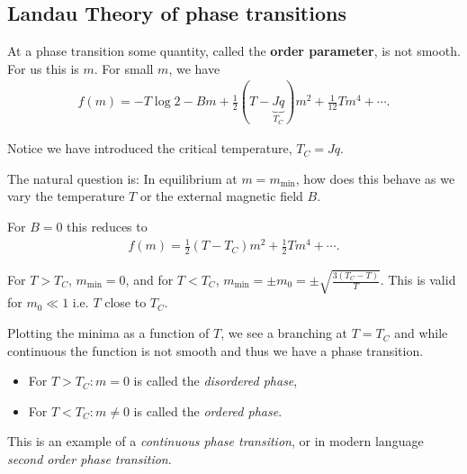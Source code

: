 \subsection{Landau Theory of phase transitions}

At a phase transition some quantity, called the \textbf{order parameter}, is not smooth. For us this is $m$. For small $m$, we have
\begin{align}
    f\left( m \right) = - T \log 2 - Bm + \frac{1}{2} \left( T - \underbrace{Jq}_{T_C} \right) m^2 + \frac{1}{12} T m^{4} + \cdots
.\end{align}

Notice we have introduced the critical temperature, $T_C = Jq$.

The natural question is: In equilibrium at $m = m_\text{min}$, how does this behave as we vary the temperature $T$ or the external magnetic field $B$.

For $B = 0$ this reduces to
\begin{align}
    f \left( m \right) = \frac{1}{2} \left( T - T_C \right) m^2 + \frac{1}{2} T m^{4} + \cdots
.\end{align}

For $T > T_C$, $m_\text{min} = 0$, and for $T < T_C$, $m_{\text{min}} = \pm m_0 = \pm \sqrt{\frac{3 \left( T_C - T \right) }{T}}$. This is valid for $m_0 \ll 1$ i.e. $T$ close to $T_C$. 

Plotting the minima as a function of $T$, we see a branching at $T = T_C$ and while continuous the function is not smooth and thus we have a phase transition.

\begin{itemize}
    \item For $T > T_C : m = 0$ is called the \textit{disordered phase},
    \item For $T < T_C : m \neq 0$ is called the \textit{ordered phase}.
\end{itemize}

This is an example of a \textit{continuous phase transition}, or in modern language \textit{second order phase transition}.

